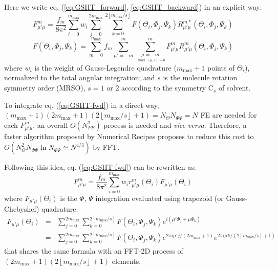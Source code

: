 Here we write eq. (\ref{eq:GSHT_forward}, \ref{eq:GSHT_backward})
in an explicit way:
\begin{equation}
F_{\mu'\mu}^{m}=\frac{f_{m}}{8\pi^{2}}\sum_{i=0}^{m_{\mathrm{max}}}w_{i}\sum_{j=0}^{2m_{\mathrm{max}}}\sum_{k=0}^{2\left\lfloor m_{\mathrm{max}}/s\right\rfloor }F(\Theta_{i},\Phi_{j},\Psi_{k})R_{\mu'\mu}^{m*}(\Theta_{i},\Phi_{j},\Psi_{k})\label{eq:GSHT-fwd}
\end{equation}
\begin{equation}
F(\Theta_{i},\Phi_{j},\Psi_{k})=\sum_{m=0}^{n_{\mathrm{max}}}f_{m}\sum_{\mu'=-m}^{m}\sum_{\underset{\mod(\mu,s)=0}{\mu=-m}}^{m}F_{\mu'\mu}^{m}R_{\mu'\mu}^{m}(\Theta_{i},\Phi_{j},\Psi_{k})\label{eq:GSHT-bwd}
\end{equation}
where $w_{i}$ is the weight of Gauss-Legendre quadrature ($m_{\mathrm{max}}+1$
points of $\Theta_{i}$), normalized to the total angular integration;
and $s$ is the molecule rotation symmetry order (\acs{MRSO}), $s=1$
or $2$ according to the symmetry $\mathrm{C}_{s}$ of solvent.

To integrate eq. (\ref{eq:GSHT-fwd}) in a direct way, $(m_{\mathrm{max}}+1)(2m_{\mathrm{max}}+1)(2\left\lfloor m_{\mathrm{max}}/s\right\rfloor +1)=N_{\Theta}N_{\Phi\Psi}=N$
\acs{FE} are needed for each $F_{\mu'\mu}^{m}$, an overall $O(N_{FE}^{2})$
process is needed and \textit{vice versa}. Therefore, a faster algorithm
proposed by Numerical Recipes \citep{Numerical_Recipes_3ed} proposes
to reduce this cost to $O(N_{\Theta}^{2}N_{\Phi\Psi}\ln N_{\Phi\Psi}\simeq N^{4/3})$
by \acs{FFT}.

Following this idea, eq. (\ref{eq:GSHT-fwd}) can be rewritten as:
\begin{equation}
F_{\mu'\mu}^{m}=\frac{f_{m}}{8\pi^{2}}\sum_{i=0}^{m_{\mathrm{max}}}w_{i}r_{\mu'\mu}^{m}(\Theta_{i})F_{\mu'\mu}(\Theta_{i})
\end{equation}
where $F_{\mu'\mu}(\Theta_{i})$ is the $\Phi$, $\Psi$ integration
evaluated using trapezoid (or Gauss-Chebyshef) quadrature:
\begin{eqnarray}
F_{\mu'\mu}(\Theta_{i}) & = & \sum_{j=0}^{2m_{\mathrm{max}}}\sum_{k=0}^{2\left\lfloor m_{\mathrm{max}}/s\right\rfloor }F(\Theta_{i},\Phi_{j},\Psi_{k})e^{i(\mu'\Phi_{j}+\mu\Psi_{k})}\label{eq:f_mup_mu}\\
 & = & \sum_{j=0}^{2m_{\mathrm{max}}}\sum_{k=0}^{2\left\lfloor m_{\mathrm{max}}/s\right\rfloor }F(\Theta_{i},\Phi_{j},\Psi_{k})e^{2\pi i\mu'j/(2m_{\mathrm{max}}+1)}e^{2\pi i\mu k/(2\left\lfloor m_{\mathrm{max}}/s\right\rfloor +1)}\nonumber 
\end{eqnarray}
that shares the same formula with an \acs{FFT}-2D process of $\left(2m_{\mathrm{max}}+1\right)\left(2\left\lfloor m_{\mathrm{max}}/s\right\rfloor +1\right)$
elements.

